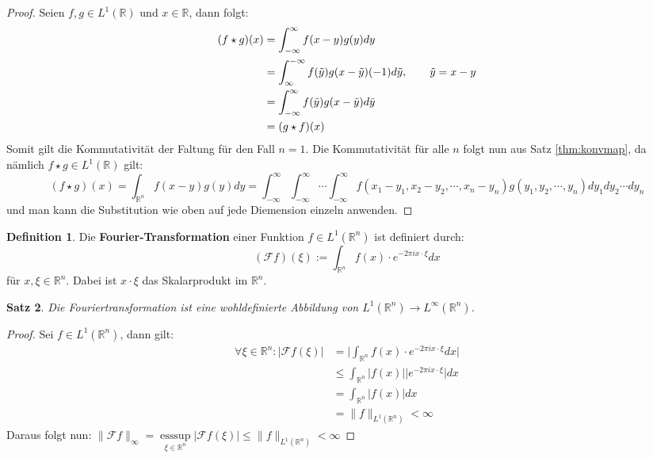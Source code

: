\documentclass{article}
\newcommand{\R}[0]{\mathbb{R}}
\theoremstyle{plain}
\newtheorem{thm}{Satz}[section]
\theoremstyle{definition}
\newtheorem{defin}[thm]{Definition}
\DeclareMathOperator{\esssup}{esssup}
\begin{document}
\begin{proof}
    Seien $f,g \in L^1(\R)$ und $x \in \R$, dann folgt:
    \begin{align*}
        (f \star g)(x) &= \int_{-\infty}^{\infty} f(x - y) g(y) dy \\
        &= \int_{\infty}^{-\infty} f(\tilde{y}) g(x - \tilde{y}) (-1)d\tilde{y}, \hspace{20px} \tilde{y} = x - y \\
        &= \int_{-\infty}^{\infty} f(\tilde{y}) g(x - \tilde{y}) d\tilde{y} \\
        &= (g \star f)(x)
    \end{align*}
    Somit gilt die Kommutativität der Faltung für den Fall $n=1$. Die Kommutativität für alle $n$ folgt nun aus Satz \ref{thm:konvmap}, da nämlich
    $f \star g \in L^1(\R)$ gilt:
    \begin{equation*}
        (f \star g)(x) = \int_{\R^n} f(x - y)g(y) dy = \int_{-\infty}^{\infty} \int_{-\infty}^{\infty} \cdots \int_{-\infty}^{\infty} f(x_1 - y_1, x_2 - y_2, \cdots, x_n - y_n) g(y_1, y_2, \cdots, y_n) dy_1 dy_2 \cdots dy_n
    \end{equation*}
    und man kann die Substitution wie oben auf jede Diemension einzeln anwenden.
\end{proof}

\begin{defin} Die \textbf{Fourier-Transformation} einer Funktion $f \in L^1(\R^n)$ ist definiert durch:
    \begin{equation}
        (\mathcal{F}f)(\xi) := \int_{\R^n} f(x) \cdot e^{-2\pi i x \cdot \xi} dx
    \end{equation}
    für $x, \xi \in \R^n$. Dabei ist $x \cdot \xi$ das Skalarprodukt im $\R^n$.
\end{defin}

\begin{thm}\label{thm:ft-map}
    Die Fouriertransformation ist eine wohldefinierte Abbildung von $L^1(\R^n) \to L^{\infty}(\R^n)$.
\end{thm}

\begin{proof}
    Sei $f \in L^1(\R^n)$, dann gilt:
    \begin{align*}
        \forall \xi \in \R^n: |\mathcal{F}f(\xi)| &= \Bigg\lvert \int_{\R^n} f(x) \cdot e^{-2\pi i x \cdot \xi} dx \Bigg\rvert \\
        &\leq \int_{\R^n} \lvert f(x) \rvert \lvert e^{-2\pi i x \cdot \xi} \rvert dx \\
        &= \int_{\R^n} \lvert f(x) \rvert dx \\
        &= \lVert f \rVert_{L^1(\R^n)} < \infty
    \end{align*}
    Daraus folgt nun: $\lVert\mathcal{F}f\rVert_{\infty} = \esssup\limits_{\xi \in \R^n} |\mathcal{F}f(\xi)| \leq \lVert f \rVert_{L^1(\R^n)} < \infty$
\end{proof}
\end{document}
